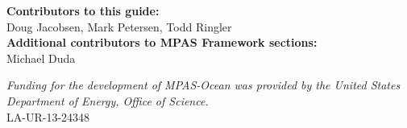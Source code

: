 \vspace{8pt}
\noindent
{\bf Contributors to this guide:}\\
Doug Jacobsen, Mark Petersen, Todd Ringler\\
{\bf Additional contributors to MPAS Framework sections:}\\
Michael Duda

\vspace{8pt}
\noindent
{\scriptsize
{\it Funding for the development of MPAS-Ocean was provided by the United States Department of Energy, Office of Science.} \\
LA-UR-13-24348}




